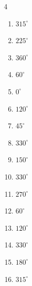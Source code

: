 \begin{multicols}{4}
\begin{enumerate}
  \item $\displaystyle 315^{\circ}$

  \item $\displaystyle 225^{\circ}$

  \item $\displaystyle 360^{\circ}$
        \phantom{$\displaystyle =2\pi$}

  \item $\displaystyle 60^{\circ}$

  \item $\displaystyle 0^{\circ}$
        \phantom{$\displaystyle =0$}

  \item $\displaystyle 120^{\circ}$

  \item $\displaystyle 45^{\circ}$

  \item $\displaystyle 330^{\circ}$

  \item $\displaystyle 150^{\circ}$

  \item $\displaystyle 330^{\circ}$

  \item $\displaystyle 270^{\circ}$

\columnbreak %

  \item $\displaystyle 60^{\circ}$

  \item $\displaystyle 120^{\circ}$

  \item $\displaystyle 330^{\circ}$

  \item $\displaystyle 180^{\circ}$
        \phantom{$\displaystyle =\pi$}

  \item $\displaystyle 315^{\circ}$


\end{enumerate}
\end{multicols}

